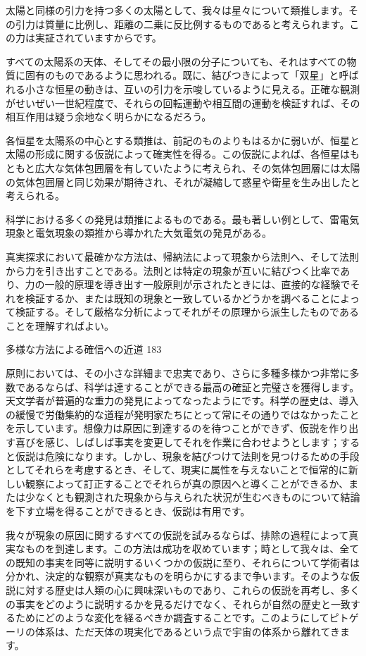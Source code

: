 \documentclass[a4paper,11pt,openany]{ltjsbook}
\begin{document}
太陽と同様の引力を持つ多くの太陽として、我々は星々について類推します。その引力は質量に比例し、距離の二乗に反比例するものであると考えられます。この力は実証されていますからです。

すべての太陽系の天体、そしてその最小限の分子についても、それはすべての物質に固有のものであるように思われる。既に、結びつきによって「双星」と呼ばれる小さな恒星の動きは、互いの引力を示唆しているように見える。正確な観測がせいぜい一世紀程度で、それらの回転運動や相互間の運動を検証すれば、その相互作用は疑う余地なく明らかになるだろう。

各恒星を太陽系の中心とする類推は、前記のものよりもはるかに弱いが、恒星と太陽の形成に関する仮説によって確実性を得る。この仮説によれば、各恒星はもともと広大な気体包囲層を有していたように考えられ、その気体包囲層には太陽の気体包囲層と同じ効果が期待され、それが凝縮して惑星や衛星を生み出したと考えられる。

科学における多くの発見は類推によるものである。最も著しい例として、雷電気現象と電気現象の類推から導かれた大気電気の発見がある。

真実探求において最確かな方法は、帰納法によって現象から法則へ、そして法則から力を引き出すことである。法則とは特定の現象が互いに結びつく比率であり、力の一般的原理を導き出す一般原則が示されたときには、直接的な経験でそれを検証するか、または既知の現象と一致しているかどうかを調べることによって検証する。そして厳格な分析によってそれがその原理から派生したものであることを理解すればよい。

多様な方法による確信への近道 183

原則においては、その小さな詳細まで忠実であり、さらに多種多様かつ非常に多数であるならば、科学は達することができる最高の確証と完璧さを獲得します。天文学者が普遍的な重力の発見によってなったようにです。科学の歴史は、導入の緩慢で労働集約的な道程が発明家たちにとって常にその通りではなかったことを示しています。想像力は原因に到達するのを待つことができず、仮説を作り出す喜びを感じ、しばしば事実を変更してそれを作業に合わせようとします；すると仮説は危険になります。しかし、現象を結びつけて法則を見つけるための手段としてそれらを考慮するとき、そして、現実に属性を与えないことで恒常的に新しい観察によって訂正することでそれらが真の原因へと導くことができるか、または少なくとも観測された現象から与えられた状況が生むべきものについて結論を下す立場を得ることができるとき、仮説は有用です。

我々が現象の原因に関するすべての仮説を試みるならば、排除の過程によって真実なものを到達します。この方法は成功を収めています；時として我々は、全ての既知の事実を同等に説明するいくつかの仮説に至り、それらについて学術者は分かれ、決定的な観察が真実なものを明らかにするまで争います。そのような仮説に対する歴史は人類の心に興味深いものであり、これらの仮説を再考し、多くの事実をどのように説明するかを見るだけでなく、それらが自然の歴史と一致するためにどのような変化を経るべきか調査することです。このようにしてピトゲーリの体系は、ただ天体の現実化であるという点で宇宙の体系から離れてきます。
\end{document}
